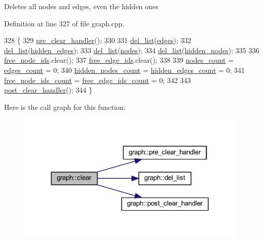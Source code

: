 Deletes all nodes and edges, even the hidden ones 

Definition at line 327 of file graph.\+cpp.


\begin{DoxyCode}
328 \{
329     \mbox{\hyperlink{classgraph_a16ccad78837d16be59854549cd2d847a}{pre\_clear\_handler}}();
330 
331     \mbox{\hyperlink{classgraph_a23f0a5fb311b7d71bb9dfc4e8aedef35}{del\_list}}(\mbox{\hyperlink{classgraph_ab5b1c610cca1bcf72b05aacc28a48153}{edges}});
332     \mbox{\hyperlink{classgraph_a23f0a5fb311b7d71bb9dfc4e8aedef35}{del\_list}}(\mbox{\hyperlink{classgraph_a0d3da33d047ba7cdc3dc68b5d9c84b88}{hidden\_edges}});
333     \mbox{\hyperlink{classgraph_a23f0a5fb311b7d71bb9dfc4e8aedef35}{del\_list}}(\mbox{\hyperlink{classgraph_a4ea0592e8eb7c26c5abad24546907726}{nodes}});
334     \mbox{\hyperlink{classgraph_a23f0a5fb311b7d71bb9dfc4e8aedef35}{del\_list}}(\mbox{\hyperlink{classgraph_a7a3f2842a409a4b35ca8ef34598df9ca}{hidden\_nodes}});
335 
336     \mbox{\hyperlink{classgraph_ae3f535853434924927a21d7725445aab}{free\_node\_ids}}.clear();
337     \mbox{\hyperlink{classgraph_a2bef57ea1db5b5541b3cce866de179f0}{free\_edge\_ids}}.clear();
338 
339     \mbox{\hyperlink{classgraph_a1f59223d0bcf647920963d7a661dd74a}{nodes\_count}} = \mbox{\hyperlink{classgraph_af560ff4263ad165c166a46084e781b4a}{edges\_count}} = 0;
340     \mbox{\hyperlink{classgraph_aa72548d972d226a69f7f8fb92b363860}{hidden\_nodes\_count}} = \mbox{\hyperlink{classgraph_a3151f544e049fbd985204ca9d8f74c97}{hidden\_edges\_count}} = 0;
341     \mbox{\hyperlink{classgraph_a9480e2310fe64c3a8ad295bb3f119772}{free\_node\_ids\_count}} = \mbox{\hyperlink{classgraph_a336be547b5e0ca43b96cf00131e0e1da}{free\_edge\_ids\_count}} = 0;
342     
343     \mbox{\hyperlink{classgraph_a870633528590b7925cd27776bdd2bbd2}{post\_clear\_handler}}();
344 \}
\end{DoxyCode}
Here is the call graph for this function\+:
\nopagebreak
\begin{figure}[H]
\begin{center}
\leavevmode
\includegraphics[width=312pt]{classgraph_a9ff5d6af3653e79f87b836701453f55a_cgraph}
\end{center}
\end{figure}
